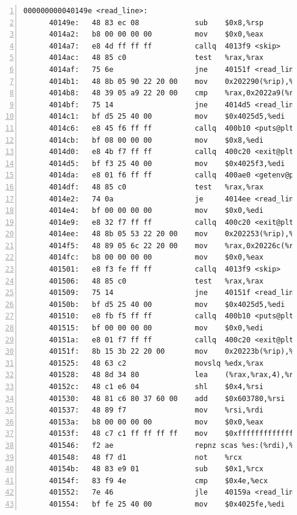 \documentclass{article}
\begin{document}
\begin{lstlisting}[title = bomb的反汇编代码及部分注释, xleftmargin = 2em,xrightmargin = 2em, aboveskip = 1em, numbers = left, basicstyle=\scriptsize\ttfamily, numberstyle=\scriptsize]
    000000000040149e <read_line>:
      40149e:	48 83 ec 08          	sub    $0x8,%rsp
      4014a2:	b8 00 00 00 00       	mov    $0x0,%eax
      4014a7:	e8 4d ff ff ff       	callq  4013f9 <skip>
      4014ac:	48 85 c0             	test   %rax,%rax
      4014af:	75 6e                	jne    40151f <read_line+0x81>
      4014b1:	48 8b 05 90 22 20 00 	mov    0x202290(%rip),%rax        # 603748 <stdin@@GLIBC_2.2.5>
      4014b8:	48 39 05 a9 22 20 00 	cmp    %rax,0x2022a9(%rip)        # 603768 <infile>
      4014bf:	75 14                	jne    4014d5 <read_line+0x37>
      4014c1:	bf d5 25 40 00       	mov    $0x4025d5,%edi
      4014c6:	e8 45 f6 ff ff       	callq  400b10 <puts@plt>
      4014cb:	bf 08 00 00 00       	mov    $0x8,%edi
      4014d0:	e8 4b f7 ff ff       	callq  400c20 <exit@plt>
      4014d5:	bf f3 25 40 00       	mov    $0x4025f3,%edi
      4014da:	e8 01 f6 ff ff       	callq  400ae0 <getenv@plt>
      4014df:	48 85 c0             	test   %rax,%rax
      4014e2:	74 0a                	je     4014ee <read_line+0x50>
      4014e4:	bf 00 00 00 00       	mov    $0x0,%edi
      4014e9:	e8 32 f7 ff ff       	callq  400c20 <exit@plt>
      4014ee:	48 8b 05 53 22 20 00 	mov    0x202253(%rip),%rax        # 603748 <stdin@@GLIBC_2.2.5>
      4014f5:	48 89 05 6c 22 20 00 	mov    %rax,0x20226c(%rip)        # 603768 <infile>
      4014fc:	b8 00 00 00 00       	mov    $0x0,%eax
      401501:	e8 f3 fe ff ff       	callq  4013f9 <skip>
      401506:	48 85 c0             	test   %rax,%rax
      401509:	75 14                	jne    40151f <read_line+0x81>
      40150b:	bf d5 25 40 00       	mov    $0x4025d5,%edi
      401510:	e8 fb f5 ff ff       	callq  400b10 <puts@plt>
      401515:	bf 00 00 00 00       	mov    $0x0,%edi
      40151a:	e8 01 f7 ff ff       	callq  400c20 <exit@plt>
      40151f:	8b 15 3b 22 20 00    	mov    0x20223b(%rip),%edx        # 603760 <num_input_strings>
      401525:	48 63 c2             	movslq %edx,%rax
      401528:	48 8d 34 80          	lea    (%rax,%rax,4),%rsi
      40152c:	48 c1 e6 04          	shl    $0x4,%rsi
      401530:	48 81 c6 80 37 60 00 	add    $0x603780,%rsi
      401537:	48 89 f7             	mov    %rsi,%rdi
      40153a:	b8 00 00 00 00       	mov    $0x0,%eax
      40153f:	48 c7 c1 ff ff ff ff 	mov    $0xffffffffffffffff,%rcx
      401546:	f2 ae                	repnz scas %es:(%rdi),%al
      401548:	48 f7 d1             	not    %rcx
      40154b:	48 83 e9 01          	sub    $0x1,%rcx
      40154f:	83 f9 4e             	cmp    $0x4e,%ecx
      401552:	7e 46                	jle    40159a <read_line+0xfc>
      401554:	bf fe 25 40 00       	mov    $0x4025fe,%edi

\end{lstlisting}
\end{document}
